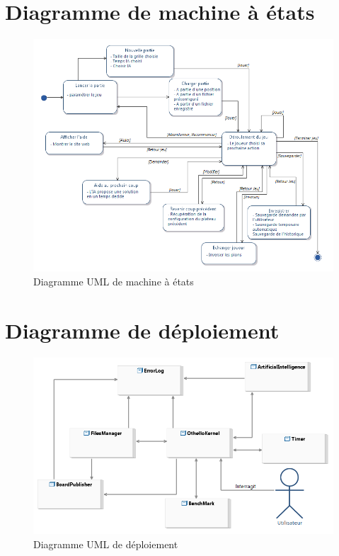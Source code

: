 \documentclass[a4paper,12pt]{report}
\begin{document}
\section{Diagramme de machine à états}
\label{C}
\begin{figure}[H]
\centering
  \includegraphics[scale=0.7]{Besoins/MachineEtat.png}
\caption{Diagramme UML de machine à états}
\end{figure}

\section{Diagramme de déploiement}
\label{A}
\begin{figure}[H]
\centering
  \includegraphics[scale=0.77]{Besoins/DeploymentDiagram.png}
\caption{Diagramme UML de déploiement}
\end{figure}
\end{document}
